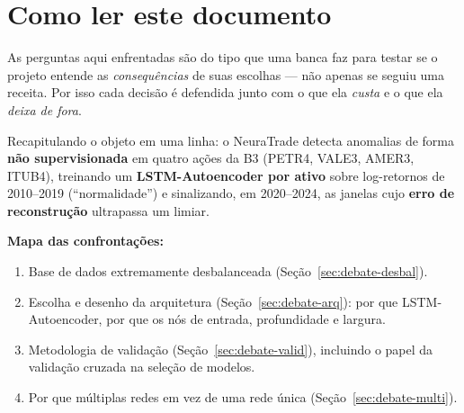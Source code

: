 \section{Como ler este documento}
\label{sec:debate-intro}

As perguntas aqui enfrentadas são do tipo que uma banca faz para testar se o
projeto entende as \emph{consequências} de suas escolhas --- não apenas se
seguiu uma receita. Por isso cada decisão é defendida junto com o que ela
\emph{custa} e o que ela \emph{deixa de fora}.

Recapitulando o objeto em uma linha: o NeuraTrade detecta anomalias de forma
\textbf{não supervisionada} em quatro ações da B3 (PETR4, VALE3, AMER3, ITUB4),
treinando um \textbf{LSTM-Autoencoder por ativo} sobre log-retornos de
2010--2019 (``normalidade'') e sinalizando, em 2020--2024, as janelas cujo
\textbf{erro de reconstrução} ultrapassa um limiar.

\medskip
\noindent\textbf{Mapa das confrontações:}
\begin{enumerate}[noitemsep]
  \item Base de dados extremamente desbalanceada (Seção~\ref{sec:debate-desbal}).
  \item Escolha e desenho da arquitetura (Seção~\ref{sec:debate-arq}):
    por que LSTM-Autoencoder, por que os nós de entrada, profundidade e largura.
  \item Metodologia de validação (Seção~\ref{sec:debate-valid}), incluindo o
    papel da validação cruzada na seleção de modelos.
  \item Por que múltiplas redes em vez de uma rede única (Seção~\ref{sec:debate-multi}).
\end{enumerate}
